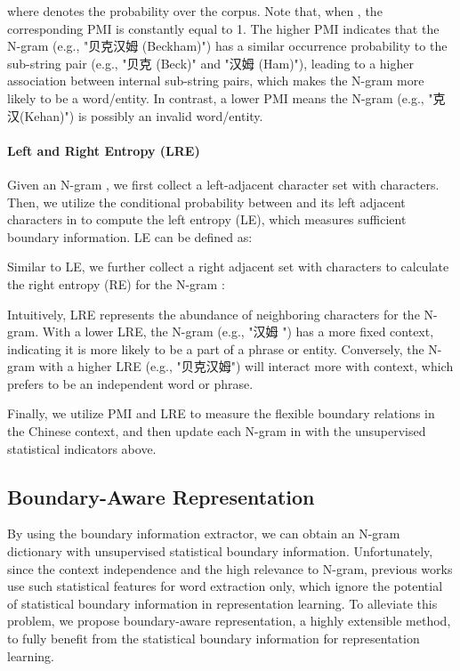 \documentclass[11pt]{article}
\begin{document}
\begin{CJK}{UTF8}{gbsn}
where  denotes the probability over the corpus.
Note that, when , the corresponding PMI is constantly equal to 1.
The higher PMI indicates that the N-gram (e.g., "贝克汉姆 (Beckham)")
has a similar occurrence probability to the sub-string pair (e.g., "贝克 (Beck)" and "汉姆 (Ham)"),
leading to a higher association between internal sub-string pairs,
which makes the N-gram more likely to be a word/entity.
In contrast, a lower PMI means the N-gram (e.g., "克汉(Kehan)") is possibly an invalid word/entity.





\paragraph{Left and Right Entropy (LRE)}
Given an N-gram , we first collect a left-adjacent character set  with  characters.
Then, we utilize the conditional probability between  and its left adjacent characters in  to compute the left entropy (LE),
which measures sufficient boundary information.
LE can be defined as:

Similar to LE, we further collect a right adjacent set  with  characters to calculate the right entropy (RE) for the N-gram :



Intuitively, LRE represents the abundance of neighboring characters for the N-gram.
With a lower LRE, the N-gram (e.g., "汉姆 ") has a more fixed context,
indicating it is more likely to be a part of a phrase or entity.
Conversely, the N-gram with a higher LRE (e.g., "贝克汉姆") will interact more with context, which prefers to be an independent word or phrase.


Finally, we utilize PMI and LRE to measure the flexible boundary relations in the Chinese context,
and then update each N-gram in  with the unsupervised statistical indicators above.


\subsection{Boundary-Aware Representation}
\label{sec:encode}
By using the boundary information extractor, we can obtain an N-gram dictionary  with unsupervised statistical boundary information.
Unfortunately, since the context independence and the high relevance to N-gram,
previous works \cite{ding-etal-2020-coupling, xiao-etal-2021-ernie} use such statistical features for word extraction only,
which ignore the potential of statistical boundary information in representation learning.
To alleviate this problem, we propose boundary-aware representation,
a highly extensible method, to fully benefit from the statistical boundary information for representation learning.



\end{CJK}
\end{document}
